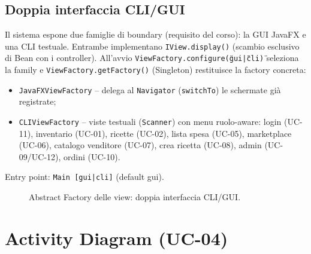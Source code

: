 \subsection{Doppia interfaccia CLI/GUI}
Il sistema espone due famiglie di boundary (requisito del corso): la GUI
JavaFX e una CLI testuale. Entrambe implementano \texttt{IView.display()}
(scambio esclusivo di Bean con i controller). All'avvio
\texttt{ViewFactory.configure(\"gui\"|\"cli\")} seleziona la family e
\texttt{ViewFactory.getFactory()} (Singleton) restituisce la factory concreta:
\begin{itemize}
    \item \texttt{JavaFXViewFactory} -- delega al \texttt{Navigator}
    (\texttt{switchTo}) le schermate già registrate;
    \item \texttt{CLIViewFactory} -- viste testuali (\texttt{Scanner}) con
    menu ruolo-aware: login (UC-11), inventario (UC-01), ricette (UC-02),
    lista spesa (UC-05), marketplace (UC-06), catalogo venditore (UC-07),
    crea ricetta (UC-08), admin (UC-09/UC-12), ordini (UC-10).
\end{itemize}
Entry point: \texttt{Main [gui|cli]} (default gui).

\begin{figure}[h]
\centering
{}
\caption{Abstract Factory delle view: doppia interfaccia CLI/GUI.}
\label{fig:view-factory}
\end{figure}

\section{Activity Diagram (UC-04)}

